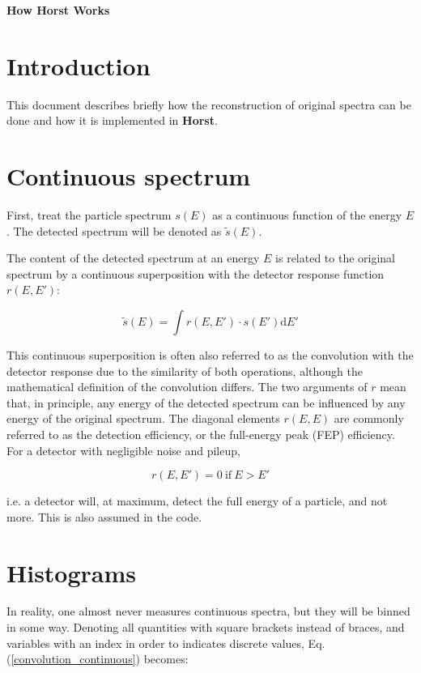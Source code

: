 \documentclass{article}
\begin{document}
\begin{titlepage}
\Huge
	\textbf{How Horst Works}
\end{titlepage}

\tableofcontents

\newpage

\section{Introduction}
This document describes briefly how the reconstruction of original spectra can be done and how it is implemented in \textbf{Horst}.

\section{Continuous spectrum}
First, treat the particle spectrum $s(E)$ as a continuous function of the energy $E$. 
The detected spectrum will be denoted as $\tilde{s}(E)$.

The content of the detected spectrum at an energy $E$ is related to the original spectrum by a continuous superposition with the detector response function $r(E, E')$:

\begin{equation}
\label{convolution_continuous}
	\tilde{s}(E) = \int r(E, E') \cdot s(E') \mathrm{d}E' 
\end{equation}

This continuous superposition is often also referred to as the convolution with the detector response due to the similarity of both operations, although the mathematical definition of the convolution differs.
The two arguments of $r$ mean that, in principle, any energy of the detected spectrum can be influenced by any energy of the original spectrum.
The diagonal elements $r(E,E)$ are commonly referred to as the detection efficiency, or the full-energy peak (FEP) efficiency.
For a detector with negligible noise and pileup, 

\begin{equation}
	\label{response_condition}
	r(E, E') = 0 ~\mathrm{if}~ E > E'
\end{equation}

i.e. a detector will, at maximum, detect the full energy of a particle, and not more. This is also assumed in the code.

\section{Histograms}
In reality, one almost never measures continuous spectra, but they will be binned in some way.
Denoting all quantities with square brackets instead of braces, and variables with an index in order to indicates discrete values, Eq. (\ref{convolution_continuous}) becomes:
\end{document}
